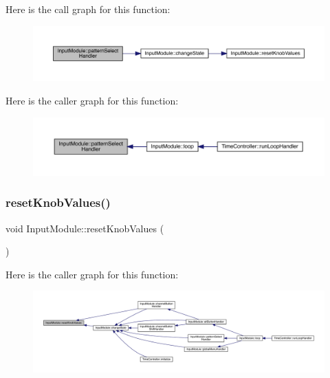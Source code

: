 Here is the call graph for this function\+:
\nopagebreak
\begin{figure}[H]
\begin{center}
\leavevmode
\includegraphics[width=350pt]{class_input_module_a92fa77f3667cbfdce6c2fbdc14854811_cgraph}
\end{center}
\end{figure}
Here is the caller graph for this function\+:
\nopagebreak
\begin{figure}[H]
\begin{center}
\leavevmode
\includegraphics[width=350pt]{class_input_module_a92fa77f3667cbfdce6c2fbdc14854811_icgraph}
\end{center}
\end{figure}
\mbox{\label{class_input_module_a1bbac8d8d543c1adfdaa955f251db63a}} 
\subsubsection{\texorpdfstring{reset\+Knob\+Values()}{resetKnobValues()}}
{\footnotesize\ttfamily void Input\+Module\+::reset\+Knob\+Values (\begin{DoxyParamCaption}{ }\end{DoxyParamCaption})}

Here is the caller graph for this function\+:
\nopagebreak
\begin{figure}[H]
\begin{center}
\leavevmode
\includegraphics[width=350pt]{class_input_module_a1bbac8d8d543c1adfdaa955f251db63a_icgraph}
\end{center}
\end{figure}
\mbox{\label{class_input_module_a6b0c9027e4088393722d00d162e4ecd9}} 
